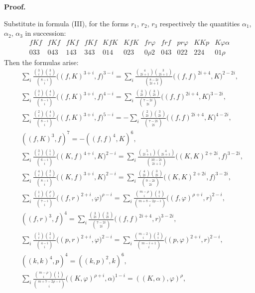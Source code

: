 \documentclass[10pt]{article}
\begin{document}
\begin{center}
{\bfseries Proof.}
\end{center}

Substitute in formula (III), for the forms $r_1$, $r_2$, $r_3$ respectively the quantities $\alpha_1$, $\alpha_2$, $\alpha_3$ in succession:
\[
\begin{array}{ccccccccccc}
fKf&fKf&fKf&fKf&KfK&KfK&fr\varphi&frf&pr\varphi&KKp&K\varphi\alpha\\
033&043&143&343&014&023&0\rho2&043&022&224&01\rho
\end{array}
\]
Then the formulas arise:
\begin{align*}
&\sum_i\frac{\binom{3}{i}\binom{3}{i}}{\binom{8-i}{i}}\bigl((f,K)^{3+i},f\bigr)^{3-i}
=\sum_i\frac{\binom{4}{2i+1}\binom{3}{2i+1}}{\binom{8-2i}{2i+1}}\bigl((f,f)^{2i+4},K\bigr)^{2-2i},\\
&\sum_i\frac{\binom{3}{i}\binom{4}{i}}{\binom{8-i}{i}}\bigl((f,K)^{3+i},f\bigr)^{4-i}
=\sum_i\frac{\binom{3}{2i}\binom{3}{2i}}{\binom{7-2i}{2i}}\bigl((f,f)^{2i+4},K\bigr)^{3-2i},\\
&\sum_i\frac{\binom{2}{i}\binom{4}{i}}{\binom{8-i}{i}}\bigl((f,K)^{3+i},f\bigr)^{5-i}
=-\sum_i\frac{\binom{2}{2i}\binom{3}{2i}}{\binom{7-2i}{2i}}\bigl((f,f)^{2i+4},K\bigr)^{4-2i},\\
&((f,K)^3,f)^7=-((f,f)^4,K)^6,\\
&\sum_i\frac{\binom{3}{i}\binom{1}{i}}{\binom{6-i}{i}}\bigl((K,f)^{4+i},K\bigr)^{2-i}
=\sum_i\frac{\binom{5}{2i+1}\binom{4}{2i+1}}{\binom{10-2i}{2i+1}}\bigl((K,K)^{2+2i},f\bigr)^{3-2i},\\
&\sum_i\frac{\binom{4}{i}\binom{2}{i}}{\binom{8-i}{i}}\bigl((K,f)^{3+i},K\bigr)^{2-i}
=\sum_i\frac{\binom{4}{2i}\binom{3}{2i}}{\binom{9-2i}{2i}}\bigl((K,K)^{2+2i},f\bigr)^{3-2i},\\
&\sum_i\frac{\binom{1}{i}\binom{\rho}{i}}{\binom{7-i}{i}}\bigl((f,r)^{2+i},\varphi\bigr)^{\rho-i}
=\sum_i\frac{\binom{m-\rho}{i}\binom{2}{i}}{\binom{m+8-2\rho-i}{i}}\bigl((f,\varphi)^{\rho+i},r\bigr)^{2-i},\\
&((f,r)^3,f)^4=\sum_i\frac{\binom{3}{2i}\binom{3}{2i}}{\binom{7-2i}{2i}}\bigl((f,f)^{2i+4},r\bigr)^{3-2i},\\
&\sum_i\frac{\binom{1}{i}\binom{2}{i}}{\binom{4-i}{i}}\bigl((p,r)^{2+i},\varphi\bigr)^{2-i}
=\sum_i\frac{\binom{m-2}{i}\binom{2}{i}}{\binom{m-i+1}{i}}\bigl((p,\varphi)^{2+i},r\bigr)^{2-i},\\
&((k,k)^4,p)^4=((k,p)^2,k)^6,\\
&\sum_i\frac{\binom{m-\rho}{i}\binom{1}{i}}{\binom{m+7-2\rho-i}{i}}\bigl((K,\varphi)^{\rho+i},\alpha\bigr)^{1-i}=((K,\alpha),\varphi)^\rho,
\end{align*}
\end{document}
